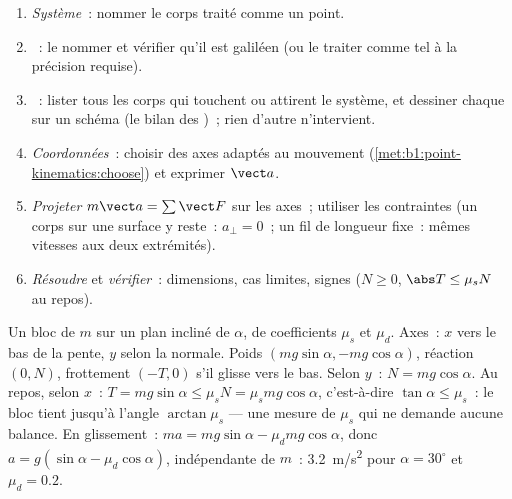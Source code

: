 \begin{method}\label{met:b1:newton-dynamics:method}
\begin{enumerate}
  \item \emph{Système}~: nommer le corps traité comme un point.
  \item \emph{}~: le nommer et vérifier qu'il est galiléen
        (ou le traiter comme tel à la précision requise).
  \item \emph{}~: lister tous les corps qui touchent ou attirent
        le système, et dessiner chaque  sur un schéma (le bilan des
        )~; rien d'autre n'intervient.
  \item \emph{Coordonnées}~: choisir des axes adaptés au mouvement
        (\cref{met:b1:point-kinematics:choose}) et exprimer $\vect a$.
  \item \emph{Projeter} $m\vect a = \sum\vect F$ sur les axes~; utiliser
        les contraintes (un corps sur une surface y reste~:
        $a_\perp = 0$~; un fil de longueur fixe~: mêmes vitesses aux deux
        extrémités).
  \item \emph{Résoudre} et \emph{vérifier}~: dimensions, cas limites,
        signes ($N \geq 0$, $\abs T \leq \mu_sN$ au repos).
\end{enumerate}
\end{method}

\begin{example}\label{ex:b1:newton-dynamics:incline}
Un bloc de  $m$ sur un plan incliné de $\alpha$, de coefficients
$\mu_s$ et $\mu_d$. Axes~: $x$ vers le bas de la pente, $y$ selon la
normale. Poids $(mg\sin\alpha, -mg\cos\alpha)$, réaction $(0, N)$,
frottement $(-T, 0)$ s'il glisse vers le bas. Selon $y$~:
$N = mg\cos\alpha$. Au repos, selon $x$~:
$T = mg\sin\alpha \leq \mu_sN = \mu_smg\cos\alpha$, c'est-à-dire $\tan\alpha
\leq \mu_s$~: le bloc tient jusqu'à l'angle $\arctan\mu_s$ --- une
mesure de $\mu_s$ qui ne demande aucune balance. En glissement~: $ma = mg\sin\alpha -
\mu_dmg\cos\alpha$, donc $a = g(\sin\alpha - \mu_d\cos\alpha)$,
indépendante de $m$~: \qty{3.2}{m/s^2} pour $\alpha = 30^\circ$ et $\mu_d = 0.2$.
\end{example}


